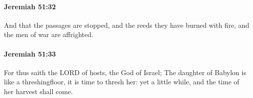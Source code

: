 		\paragraph{Jeremiah 51:32} %
			\label{JEREMIAH-51-32}

			And that the passages are stopped, and the reeds they have burned with fire, and the men of war are affrighted.


		\paragraph{Jeremiah 51:33} %
			\label{JEREMIAH-51-33}

			For thus saith the LORD of hosts, the God of Israel; The daughter of Babylon is like a threshingfloor, it is time to thresh her: yet a little while, and the time of her harvest shall come.


